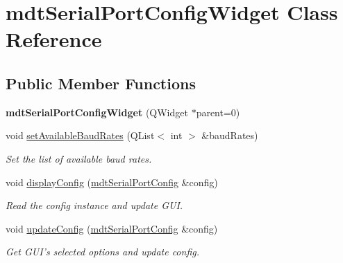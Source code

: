 \hypertarget{classmdt_serial_port_config_widget}{
\section{mdtSerialPortConfigWidget Class Reference}
\label{classmdt_serial_port_config_widget}
}
\subsection*{Public Member Functions}
\begin{DoxyCompactItemize}
\item 
\hypertarget{classmdt_serial_port_config_widget_a7c6dc14693263f011e0725d45040b0f3}{
{\bfseries mdtSerialPortConfigWidget} (QWidget $\ast$parent=0)}
\label{classmdt_serial_port_config_widget_a7c6dc14693263f011e0725d45040b0f3}

\item 
\hypertarget{classmdt_serial_port_config_widget_a5113611573e0e8cc0fd030e887e17c86}{
void \hyperlink{classmdt_serial_port_config_widget_a5113611573e0e8cc0fd030e887e17c86}{setAvailableBaudRates} (QList$<$ int $>$ \&baudRates)}
\label{classmdt_serial_port_config_widget_a5113611573e0e8cc0fd030e887e17c86}

\begin{DoxyCompactList}\small\item\em Set the list of available baud rates. \end{DoxyCompactList}\item 
\hypertarget{classmdt_serial_port_config_widget_a3cc8a728e224b656510896f31047fb73}{
void \hyperlink{classmdt_serial_port_config_widget_a3cc8a728e224b656510896f31047fb73}{displayConfig} (\hyperlink{classmdt_serial_port_config}{mdtSerialPortConfig} \&config)}
\label{classmdt_serial_port_config_widget_a3cc8a728e224b656510896f31047fb73}

\begin{DoxyCompactList}\small\item\em Read the config instance and update GUI. \end{DoxyCompactList}\item 
void \hyperlink{classmdt_serial_port_config_widget_aebc1fba656f51f9910a466add7987fcf}{updateConfig} (\hyperlink{classmdt_serial_port_config}{mdtSerialPortConfig} \&config)
\begin{DoxyCompactList}\small\item\em Get GUI's selected options and update config. \end{DoxyCompactList}\end{DoxyCompactItemize}


